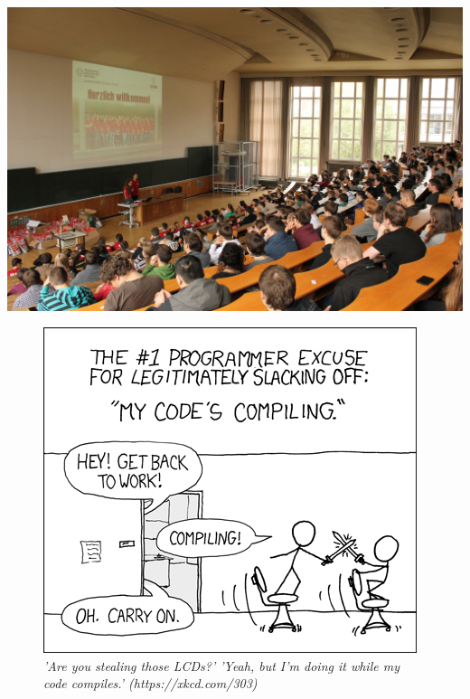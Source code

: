\vfill

\includegraphics[width=\linewidth]{img/ese2013/barschoe.jpg}

\vfill

\begin{figure}[h!]
\centering
\includegraphics[scale=.5]{img/xkcd/compiling.png}
\caption*{{\small \textit{'Are you stealing those LCDs?' 'Yeah, but I'm doing it while my code compiles.' (https://xkcd.com/303)}}}
\end{figure}
